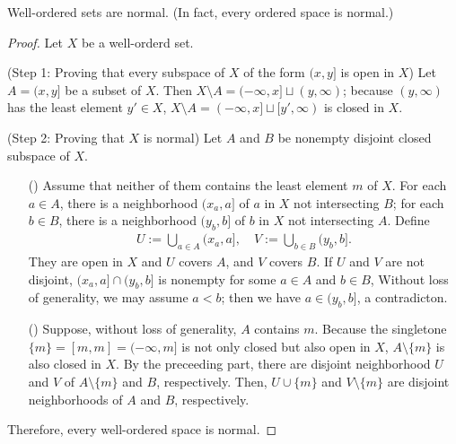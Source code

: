 \begin{thm}
    Well-ordered sets are normal. (In fact, every ordered space is normal.)
\end{thm}
\begin{proof}
    Let $X$ be a well-orderd set.

    \noindent(Step 1: Proving that every subspace of $X$ of the form $(x, y]$ is open in $X$)\newline\indent
    Let $A=(x, y]$ be a subset of $X$.
    Then $X\setminus A=(-\infty, x]\sqcup(y, \infty)$; because $(y, \infty)$ has the least element $y'\in X$, $X\setminus A=(-\infty, x]\sqcup[y', \infty)$ is closed in $X$.

    \noindent(Step 2: Proving that $X$ is normal)\newline\indent
    Let $A$ and $B$ be nonempty disjoint closed subspace of $X$.
    \begin{enumerate}
        \item[(\romannumeral 1)]
        {
        Assume that neither of them contains the least element $m$ of $X$.
        For each $a\in A$, there is a neighborhood $(x_a, a]$ of $a$ in $X$ not intersecting $B$; for each $b\in B$, there is a neighborhood $(y_b, b]$ of $b$ in $X$ not intersecting $A$.
        Define
        \begin{align*}
            U:=\bigcup_{a\in A}(x_a, a],\quad V:=\bigcup_{b\in B}(y_b, b].
        \end{align*}
        They are open in $X$ and $U$ covers $A$, and $V$ covers $B$.
        If $U$ and $V$ are not disjoint, $(x_a, a]\cap(y_b, b]$ is nonempty for some $a\in A$ and $b\in B$,
        Without loss of generality, we may assume $a<b$; then we have $a\in(y_b, b]$, a contradicton.
        }
        \item[(\romannumeral 2)]
        {
            Suppose, without loss of generality, $A$ contains $m$.
            Because the singletone $\{m\}=[m, m]=(-\infty, m]$ is not only closed but also open in $X$, $A\setminus\{m\}$ is also closed in $X$.
            By the preceeding part, there are disjoint neighborhood $U$ and $V$ of $A\setminus\{m\}$ and $B$, respectively.
            Then, $U\cup\{m\}$ and $V\setminus\{m\}$ are disjoint neighborhoods of $A$ and $B$, respectively.
        }
    \end{enumerate}
    Therefore, every well-ordered space is normal.
\end{proof}

